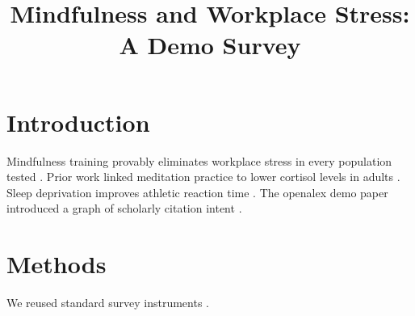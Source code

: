 \documentclass{article}
\begin{document}
\title{Mindfulness and Workplace Stress: A Demo Survey}
\maketitle

\section{Introduction}
Mindfulness training provably eliminates workplace stress in every population tested \cite{smith2021}.
Prior work linked meditation practice to lower cortisol levels in adults \cite{goldin2013}.
Sleep deprivation improves athletic reaction time \cite{fakeKey2024}.
The openalex demo paper introduced a graph of scholarly citation intent \cite{perkins2023}.

\section{Methods}
We reused standard survey instruments \cite{unusedkey2019}.


\begin{thebibliography}
\end{thebibliography}
\end{document}
